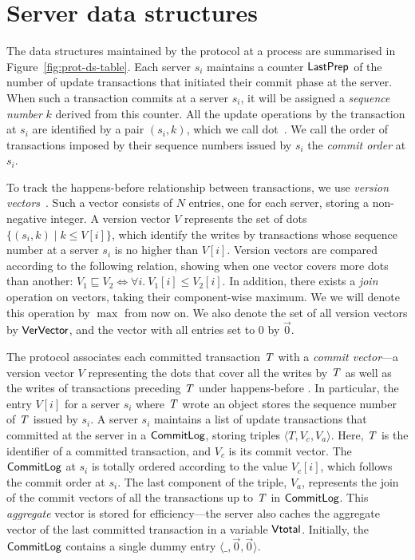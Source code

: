 \section{Server data structures}

The data structures maintained by the protocol at a process are summarised in Figure~\ref{fig:prot-ds-table}. Each server $s_i$ maintains a counter $\mathsf{LastPrep}$ of the number of update transactions that initiated their commit phase at the server. When such a transaction commits at a server $s_i$, it will be assigned a \emph{sequence number} $k$ derived from this counter. All the update operations by the transaction at $s_i$ are identified by a pair $(s_i, k)$, which we call dot~\citep{carlos-causality}. We call the order of transactions imposed by their sequence numbers issued by $s_i$ the \emph{commit order} at $s_i$.

To track the happens-before  relationship between transactions, we use \emph{version vectors}~\citep{version-vectors}. Such a vector consists of $N$ entries, one for each server, storing a non-negative integer. A version vector $V$ represents the set of dots $\{(s_i, k) \mid k \le V[i]\}$, which identify the writes by transactions whose sequence number at a server $s_i$ is no higher than $V[i]$. Version vectors are compared according to the following relation, showing when one vector covers more dots than another: $V_1 \sqsubseteq V_2 \iff \forall i.\ V_1[i] \le V_2[i]$. In addition, there exists a \emph{join} operation on vectors, taking their component-wise maximum. We we will denote this operation by $\max$ from now on. We also denote the set of all version vectors by $\mathsf{VerVector}$, and the vector with all entries set to $0$ by $\vec{0}$.

The protocol associates each committed transaction $\mathit{T}$ with a \emph{commit vector}---a version vector $V$ representing the dots that cover all the writes by $\mathit{T}$ as well as the writes of transactions preceding $\mathit{T}$ under happens-before . In particular, the entry $V[i]$ for a server $s_i$ where $\mathit{T}$ wrote an object stores the sequence number of $\mathit{T}$ issued by $s_i$. A server $s_i$ maintains a list of update transactions that committed at the server in a $\mathsf{CommitLog}$, storing triples $\langle T,V_c,V_a\rangle$. Here, $\mathit{T}$ is the identifier of a committed transaction, and $V_c$ is its commit vector. The $\mathsf{CommitLog}$ at $s_i$ is totally ordered according to the value $V_c[i]$, which follows the commit order at $s_i$. The last component of the triple, $V_a$, represents the join of the commit vectors of all the transactions up to $\mathit{T}$ in $\mathsf{CommitLog}$. This \emph{aggregate} vector is stored for efficiency---the server also caches the aggregate vector of the last committed transaction in a variable $\mathsf{Vtotal}$. Initially, the $\mathsf{CommitLog}$ contains a single dummy entry $\langle \_, \vec{0}, \vec{0} \rangle$.

